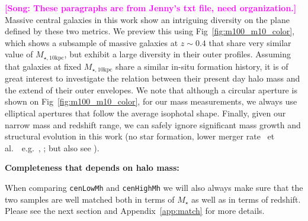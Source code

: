 \documentclass[a4paper,fleqn,usenatbib]{mnras}
\def\etal{{\ et al.~}}
\def\rbcg{\texttt{cenHighMh}}
\def\nbcg{\texttt{cenLowMh}}
\def\mstar{{$M_{\star}$}}
\def\minn{{$M_{\star,10\mathrm{kpc}}$}}
\newcommand{\song}[1]{\textcolor{magenta}{\textbf{[Song: #1]}}}
\begin{document}
    
    

    \song{These paragraphs are from Jenny's txt file, need organization.}
    Massive central galaxies in this work show an intriguing diversity on the plane 
    defined by these two metrics.  
    We preview this using Fig~\ref{fig:m100_m10_color}, which shows a subsample of 
    massive galaxies at $z{\sim} 0.4$ that share very similar value of \minn{}, but 
    exhibit a large diversity in their outer profiles. 
    Assuming that galaxies at fixed \minn{} share a similar in-situ formation history, 
    it is of great interest to investigate the relation between their present day halo 
    mass and the extend of their outer envelopes. 
    We note that although a circular aperture is shown on Fig~\ref{fig:m100_m10_color}, 
    for our mass measurements, we always use elliptical apertures that follow the 
    average isophotal shape. Finally, given our narrow mass and redshift range, we 
    can safely ignore significant mass growth and structural evolution in this work
    (no star formation, lower merger rate \etal~e.g.\ \citealt{Bellstedt2016},
    \citealt{Inagaki2015}; but also see \citealt{Bai2014}). 

    
    \textbf{Completeness that depends on halo mass:}



    When comparing \nbcg{} and \rbcg{} we will also always make sure that the two 
    samples are well matched both in terms of \mstar{} as well as in terms of redshift. 
    Please see the next section and Appendix~\ref{app:match} for more details.
\end{document}
